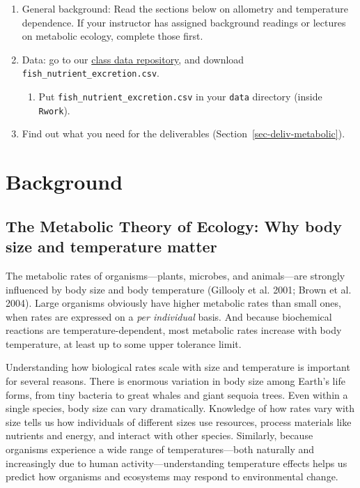 \documentclass[
  letterpaper,
  DIV=11,
  numbers=noendperiod]{scrreprt}
\providecommand{\tightlist}{%
  \setlength{\itemsep}{0pt}\setlength{\parskip}{0pt}}
\begin{document}
\begin{enumerate}
\def\labelenumi{\arabic{enumi}.}
\tightlist
\item
  General background: Read the sections below on allometry and
  temperature dependence. If your instructor has assigned background
  readings or lectures on metabolic ecology, complete those first.
\item
  Data: go to our
  \href{https://drive.google.com/drive/u/1/folders/1FR2FLiW3xyD4Er52YzVTToPZuXXReGRo}{class
  data repository}, and download \texttt{fish\_nutrient\_excretion.csv}.

  \begin{enumerate}
  \def\labelenumii{\alph{enumii}.}
  \tightlist
  \item
    Put \texttt{fish\_nutrient\_excretion.csv} in your \texttt{data}
    directory (inside \texttt{Rwork}).
  \end{enumerate}
\item
  Find out what you need for the deliverables
  (Section~\ref{sec-deliv-metabolic}).
\end{enumerate}

\section{Background}\label{background-9}

\subsection{The Metabolic Theory of Ecology: Why body size and
temperature
matter}\label{the-metabolic-theory-of-ecology-why-body-size-and-temperature-matter}

The metabolic rates of organisms---plants, microbes, and animals---are
strongly influenced by body size and body temperature (Gillooly et al.
2001; Brown et al. 2004). Large organisms obviously have higher
metabolic rates than small ones, when rates are expressed on a \emph{per
individual} basis. And because biochemical reactions are
temperature-dependent, most metabolic rates increase with body
temperature, at least up to some upper tolerance limit.

Understanding how biological rates scale with size and temperature is
important for several reasons. There is enormous variation in body size
among Earth's life forms, from tiny bacteria to great whales and giant
sequoia trees. Even within a single species, body size can vary
dramatically. Knowledge of how rates vary with size tells us how
individuals of different sizes use resources, process materials like
nutrients and energy, and interact with other species. Similarly,
because organisms experience a wide range of temperatures---both
naturally and increasingly due to human activity---understanding
temperature effects helps us predict how organisms and ecosystems may
respond to environmental change.
\end{document}
